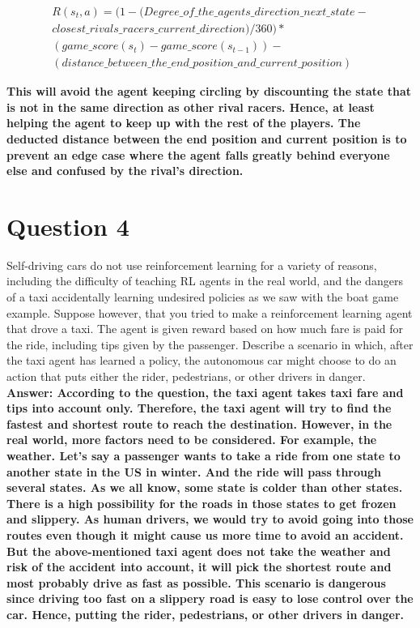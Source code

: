\documentclass[12pt]{extarticle}
\begin{document}
\begin{equation}
\begin{split}
R(s_t, a) = (1 - (Degree\_of\_the\_agents\_direction\_next\_state - \\ closest\_rivals\_racers\_current\_direction) / 360) * \\(game\_score(s_t) - game\_score(s_{t-1})) - \\(distance\_between\_the\_end\_position\_and\_current\_position)
\end{split}
\end{equation}

\noindent\textbf{This will avoid the agent keeping circling by discounting the state that is not in the same direction as other rival racers. Hence, at least helping the agent to keep up with the rest of the players. The deducted distance between the end position and current position is to prevent an edge case where the agent falls greatly behind everyone else and confused by the rival’s direction.}

\newpage
\section*{Question 4}

Self-driving cars do not use reinforcement learning for a variety of reasons, including the difficulty of teaching RL agents in the real world, and the dangers of a taxi accidentally learning undesired policies as we saw with the boat game example. Suppose however, that you tried to make a reinforcement learning agent that drove a taxi. The agent is given reward based on how much fare is paid for the ride, including tips given by the passenger. Describe a scenario in which, after the taxi agent has learned a policy, the autonomous car might choose to do an action that puts either the rider, pedestrians, or other drivers in danger. \\

\noindent\textbf{Answer: According to the question, the taxi agent takes taxi fare and tips into account only. Therefore, the taxi agent will try to find the fastest and shortest route to reach the destination. However, in the real world, more factors need to be considered. For example, the weather. Let’s say a passenger wants to take a ride from one state to another state in the US in winter. And the ride will pass through several states. As we all know, some state is colder than other states. There is a high possibility for the roads in those states to get frozen and slippery. As human drivers, we would try to avoid going into those routes even though it might cause us more time to avoid an accident. But the above-mentioned taxi agent does not take the weather and risk of the accident into account, it will pick the shortest route and most probably drive as fast as possible. This scenario is dangerous since driving too fast on a slippery road is easy to lose control over the car. Hence, putting the rider, pedestrians, or other drivers in danger. }
\end{document}
